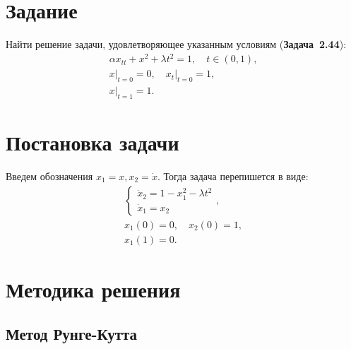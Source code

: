 \documentclass[a4paper,12pt]{article}
\newcommand{\UpdateMe}[1]{\textcolor{red}{#1}}
\newcommand{\University}{Московский государственный университет имени М.~В.~Ломоносова}
\newcommand{\Department}{Кафедра \UpdateMe{НАЗВАНИЕ-КАФЕДРЫ}}
\newcommand{\Student}{\UpdateMe{ИМЯ-СТУДЕНТА}}
\newcommand{\GroupNum}{\UpdateMe{НОМЕР}}
\newcommand{\Seminar}{\UpdateMe{НАЗВАНИЕ-ПРАКТИКУМА}}
\begin{document}

\section*{Задание}
Найти решение задачи, удовлетворяющее указанным условиям ({\bfseries Задача~2.44}):
\begin{gather*}
  \alpha x_{tt}+x^2+\lambda t^2=1, \quad t\in(0, 1),\\
  \left.x\right\vert_{t=0}=0, \quad \left.x_{t}\right\vert_{t=0}=1,\\
  \left.x\right\vert_{t=1}=1.
\end{gather*}

\section*{Постановка задачи}

Введем обозначения \(x_1 = x, x_2=\dot{x}\). Тогда задача перепишется в виде:
\begin{gather}
  \label{common_system} \begin{cases}\dot{x}_2=1-x_1^2-\lambda t^2\\ \dot{x}_1=x_2 \end{cases},\\
  \label{left_conditions} x_1(0) = 0, \quad x_2(0)=1,\\
  \label{right_conditions} x_1(1) = 0.
\end{gather}

\section*{Методика решения}

\subsection*{Метод Рунге-Кутта}
\end{document}
